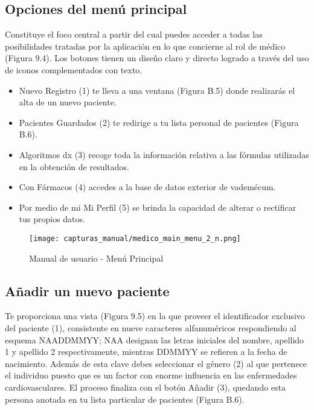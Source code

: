 \documentclass[11pt,spanish,
		listoftables,listoffigures]
		{tfgplantilla}
\begin{document}
\subsection {Opciones del menú principal}
Constituye el foco central a partir del cual puedes acceder a todas las posibilidades tratadas por la aplicación en lo que concierne al rol de médico (Figura 9.4). Los botones tienen un diseño claro y directo logrado a través del uso de iconos complementados con texto. 

\begin{itemize}
	\item \textquotedbl Nuevo Registro\textquotedbl{} (1) te lleva a una ventana (Figura B.5) donde realizarás el alta de un nuevo paciente.

	\item \textquotedbl Pacientes Guardados\textquotedbl{} (2) te redirige a tu lista personal de pacientes (Figura B.6).

	\item \textquotedbl Algoritmos dx\textquotedbl{} (3) recoge toda la información relativa a las fórmulas utilizadas en la obtención de resultados.

	\item Con \textquotedbl Fármacos\textquotedbl{} (4) accedes a la base de datos exterior de vademécum.

	\item Por medio de mi \textquotedbl Mi Perfil\textquotedbl{} (5) se brinda la capacidad de alterar o rectificar tus propios datos.
\end{itemize}

\begin{figure}[H]
\centering
\texttt{[image: capturas\_manual/medico\_main\_menu\_2\_n.png]}
\caption{Manual de usuario - Menú Principal}
\end{figure}

\subsection {Añadir un nuevo paciente}

Te proporciona una vista (Figura 9.5) en la que proveer el identificador exclusivo del paciente (1), consistente en nueve caracteres alfanuméricos respondiendo al esquema NAADDMMYY; NAA designan las letras iniciales del nombre, apellido 1 y apellido 2 respectivamente, mientras DDMMYY se refieren a la fecha de nacimiento. Además de esta clave debes seleccionar el género (2) al que pertenece el individuo puesto que es un factor con enorme influencia en las enfermedades cardiovasculares. El proceso finaliza con el botón \textquotedbl Añadir\textquotedbl{} (3), quedando esta persona anotada en tu lista particular de pacientes (Figura B.6).
\end{document}
